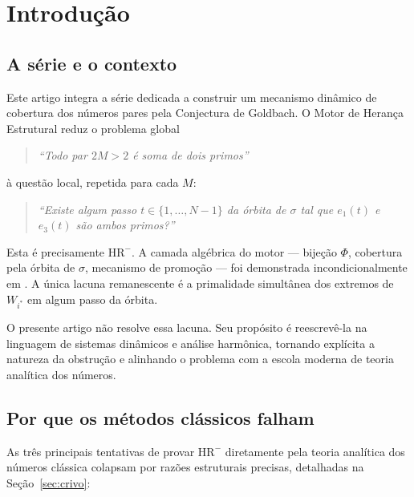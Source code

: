 \documentclass[12pt,a4paper]{article}
\theoremstyle{definition}
\newcommand{\HRm}{\mathrm{HR}^{-}}
\begin{document}
	\tableofcontents
	\newpage
	
	\section{Introdução}
	\label{sec:intro}
	
	\subsection{A série e o contexto}
	
	Este artigo integra a série \cite{goldbach1,grade,ancora,crivo_b,motor}
	dedicada a construir um mecanismo dinâmico de cobertura dos números pares
	pela Conjectura de Goldbach. O Motor de Herança Estrutural \cite{motor}
	reduz o problema global
	\begin{quote}
		\emph{``Todo par $2M > 2$ é soma de dois primos''}
	\end{quote}
	à questão local, repetida para cada $M$:
	\begin{quote}
		\emph{``Existe algum passo $t \in \{1,\ldots,N-1\}$ da órbita de
			$\sigma$ tal que $e_1(t)$ e $e_3(t)$ são ambos primos?''}
	\end{quote}
	Esta é precisamente $\HRm$. A camada algébrica do motor — bijeção $\Phi$,
	cobertura pela órbita de $\sigma$, mecanismo de promoção — foi demonstrada
	incondicionalmente em \cite{motor}. A única lacuna remanescente é a
	primalidade simultânea dos extremos de $W_{i^*}$ em algum passo da órbita.
	
	O presente artigo não resolve essa lacuna. Seu propósito é reescrevê-la
	na linguagem de sistemas dinâmicos e análise harmônica, tornando explícita
	a natureza da obstrução e alinhando o problema com a escola moderna de
	teoria analítica dos números.
	
	\subsection{Por que os métodos clássicos falham}
	
	As três principais tentativas de provar $\HRm$ diretamente pela teoria
	analítica dos números clássica colapsam por razões estruturais precisas,
	detalhadas na Seção~\ref{sec:crivo}:
	
\end{document}
